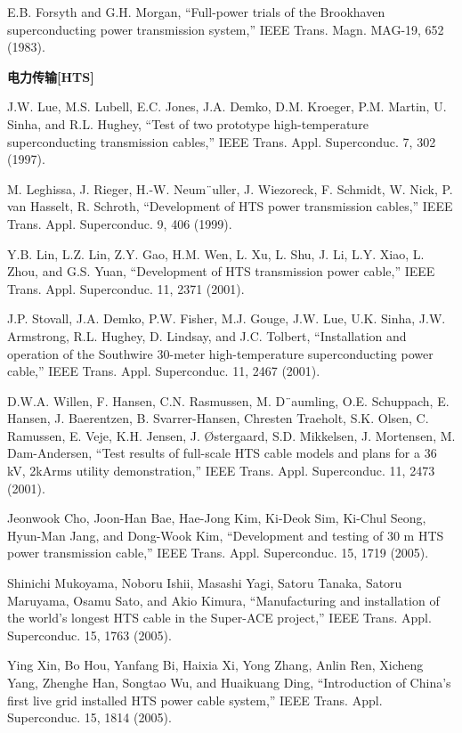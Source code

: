 \noindent [9.179] E.B. Forsyth and G.H. Morgan, ``Full-power trials of the Brookhaven superconducting
power transmission system,” IEEE Trans. Magn. MAG-19, 652 (1983).

\noindent \textbf{电力传输[HTS] }

\noindent [9.180] J.W. Lue, M.S. Lubell, E.C. Jones, J.A. Demko, D.M. Kroeger, P.M. Martin, U.
Sinha, and R.L. Hughey, ``Test of two prototype high-temperature superconducting
transmission cables,” IEEE Trans. Appl. Superconduc. 7, 302 (1997).

\noindent [9.181] M. Leghissa, J. Rieger, H.-W. Neum¨uller, J. Wiezoreck, F. Schmidt, W. Nick, P.
van Hasselt, R. Schroth, ``Development of HTS power transmission cables,” IEEE
Trans. Appl. Superconduc. 9, 406 (1999).

\noindent [9.182] Y.B. Lin, L.Z. Lin, Z.Y. Gao, H.M. Wen, L. Xu, L. Shu, J. Li, L.Y. Xiao, L. Zhou,
and G.S. Yuan, ``Development of HTS transmission power cable,” IEEE Trans.
Appl. Superconduc. 11, 2371 (2001).

\noindent [9.183] J.P. Stovall, J.A. Demko, P.W. Fisher, M.J. Gouge, J.W. Lue, U.K. Sinha, J.W.
Armstrong, R.L. Hughey, D. Lindsay, and J.C. Tolbert, ``Installation and operation
of the Southwire 30-meter high-temperature superconducting power cable,”
IEEE Trans. Appl. Superconduc. 11, 2467 (2001).

\noindent [9.184] D.W.A. Willen, F. Hansen, C.N. Rasmussen, M. D¨aumling, O.E. Schuppach, E.
Hansen, J. Baerentzen, B. Svarrer-Hansen, Chresten Traeholt, S.K. Olsen, C. Ramussen,
E. Veje, K.H. Jensen, J. Østergaard, S.D. Mikkelsen, J. Mortensen, M.
Dam-Andersen, ``Test results of full-scale HTS cable models and plans for a 36 kV,
2kArms utility demonstration,” IEEE Trans. Appl. Superconduc. 11, 2473 (2001).

\noindent [9.185] Jeonwook Cho, Joon-Han Bae, Hae-Jong Kim, Ki-Deok Sim, Ki-Chul Seong,
Hyun-Man Jang, and Dong-Wook Kim, ``Development and testing of 30 m HTS
power transmission cable,” IEEE Trans. Appl. Superconduc. 15, 1719 (2005).

\noindent [9.186] Shinichi Mukoyama, Noboru Ishii, Masashi Yagi, Satoru Tanaka, Satoru Maruyama,
Osamu Sato, and Akio Kimura, ``Manufacturing and installation of the
world’s longest HTS cable in the Super-ACE project,” IEEE Trans. Appl. Superconduc.
15, 1763 (2005).

\noindent [9.187] Ying Xin, Bo Hou, Yanfang Bi, Haixia Xi, Yong Zhang, Anlin Ren, Xicheng Yang,
Zhenghe Han, Songtao Wu, and Huaikuang Ding, ``Introduction of China’s first
live grid installed HTS power cable system,” IEEE Trans. Appl. Superconduc. 15,
1814 (2005).

